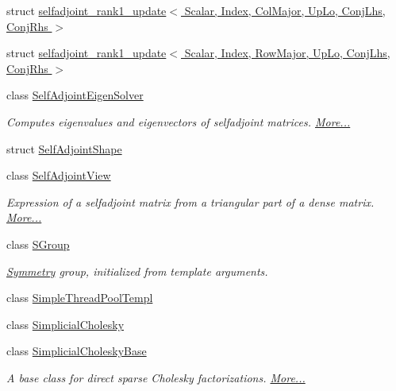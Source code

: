 \begin{DoxyCompactItemize}
\item 
struct \hyperlink{struct_eigen_1_1selfadjoint__rank1__update_3_01_scalar_00_01_index_00_01_col_major_00_01_up_lo_0985162e7429113fdcd7a3950b8d00f1e}{selfadjoint\+\_\+rank1\+\_\+update$<$ Scalar, Index, Col\+Major, Up\+Lo, Conj\+Lhs, Conj\+Rhs $>$}
\item 
struct \hyperlink{struct_eigen_1_1selfadjoint__rank1__update_3_01_scalar_00_01_index_00_01_row_major_00_01_up_lo_03a9dcf0deae11b1da493e4caae5cd21a}{selfadjoint\+\_\+rank1\+\_\+update$<$ Scalar, Index, Row\+Major, Up\+Lo, Conj\+Lhs, Conj\+Rhs $>$}
\item 
class \hyperlink{group___eigenvalues___module_class_eigen_1_1_self_adjoint_eigen_solver}{Self\+Adjoint\+Eigen\+Solver}
\begin{DoxyCompactList}\small\item\em Computes eigenvalues and eigenvectors of selfadjoint matrices.  \hyperlink{group___eigenvalues___module_class_eigen_1_1_self_adjoint_eigen_solver}{More...}\end{DoxyCompactList}\item 
struct \hyperlink{struct_eigen_1_1_self_adjoint_shape}{Self\+Adjoint\+Shape}
\item 
class \hyperlink{group___core___module_class_eigen_1_1_self_adjoint_view}{Self\+Adjoint\+View}
\begin{DoxyCompactList}\small\item\em Expression of a selfadjoint matrix from a triangular part of a dense matrix.  \hyperlink{group___core___module_class_eigen_1_1_self_adjoint_view}{More...}\end{DoxyCompactList}\item 
class \hyperlink{class_eigen_1_1_s_group}{S\+Group}
\begin{DoxyCompactList}\small\item\em \hyperlink{struct_eigen_1_1_symmetry}{Symmetry} group, initialized from template arguments. \end{DoxyCompactList}\item 
class \hyperlink{class_eigen_1_1_simple_thread_pool_templ}{Simple\+Thread\+Pool\+Templ}
\item 
class \hyperlink{group___sparse_cholesky___module_class_eigen_1_1_simplicial_cholesky}{Simplicial\+Cholesky}
\item 
class \hyperlink{group___sparse_cholesky___module_class_eigen_1_1_simplicial_cholesky_base}{Simplicial\+Cholesky\+Base}
\begin{DoxyCompactList}\small\item\em A base class for direct sparse Cholesky factorizations.  \hyperlink{group___sparse_cholesky___module_class_eigen_1_1_simplicial_cholesky_base}{More...}\end{DoxyCompactList}\item 

\end{DoxyCompactItemize}
